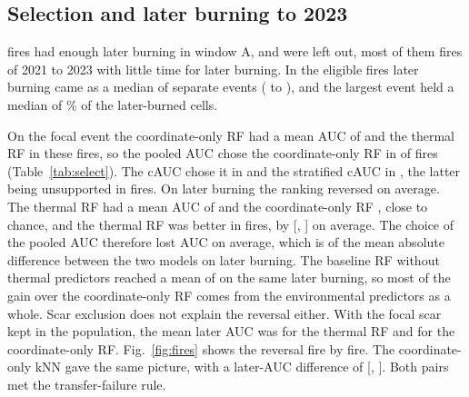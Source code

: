 \documentclass[preprint,12pt,authoryear]{elsarticle}
\begin{document}
\subsection{Selection and later burning to 2023}
\label{sec:res-a}

\sAElig{} fires had enough later burning in window A, and \sAExcl{} were left out, most of them fires of 2021 to 2023 with little time for later burning. In the eligible fires later burning came as a median of \sAEventsMed{} separate events (\sAEventsMin{} to \sAEventsMax), and the largest event held a median of \sALargestMed\% of the later-burned cells.

On the focal event the coordinate-only RF had a mean AUC of \sAFocCoord{} and the thermal RF \sAFocTherm{} in these fires, so the pooled AUC chose the coordinate-only RF in \sACrfChAuc{} of \sAElig{} fires (Table~\ref{tab:select}). The cAUC chose it in \sACrfChCauc{} and the stratified cAUC in \sACrfChSauc, the latter being unsupported in \sAUnsupSauc{} fires. On later burning the ranking reversed on average. The thermal RF had a mean AUC of \sALateTherm{} and the coordinate-only RF \sALateCoord, close to chance, and the thermal RF was better in \sACrfBetter{} fires, by \sACrfDiff{} [\sACrfDiffLo, \sACrfDiffHi] on average. The choice of the pooled AUC therefore lost \sACrfLossAuc{} AUC on average, which is \sACrfRel{} of the mean absolute difference between the two models on later burning. The baseline RF without thermal predictors reached a mean of \sABaseLate{} on the same later burning, so most of the gain over the coordinate-only RF comes from the environmental predictors as a whole. Scar exclusion does not explain the reversal either. With the focal scar kept in the population, the mean later AUC was \sAFullTherm{} for the thermal RF and \sAFullCoord{} for the coordinate-only RF. Fig.~\ref{fig:fires} shows the reversal fire by fire. The coordinate-only kNN gave the same picture, with a later-AUC difference of \sAKnnDiff{} [\sAKnnDiffLo, \sAKnnDiffHi]. Both pairs met the transfer-failure rule.
\end{document}
